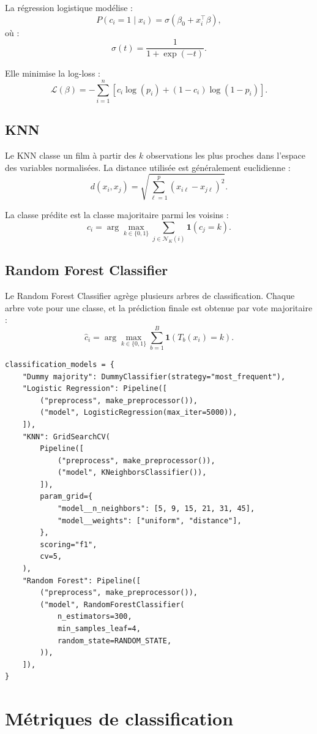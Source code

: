 \documentclass[11pt,a4paper]{article}
\begin{document}
La régression logistique modélise :
\[
P(c_i=1 \mid x_i)
=
\sigma(\beta_0 + x_i^\top\beta),
\]
où :
\[
\sigma(t)=\frac{1}{1+\exp(-t)}.
\]

Elle minimise la log-loss :
\[
\mathcal{L}(\beta)
=
-\sum_{i=1}^{n}
\left[
c_i \log(p_i)
+
(1-c_i)\log(1-p_i)
\right].
\]

\subsection{KNN}

Le KNN classe un film à partir des $k$ observations les plus proches dans l'espace des variables normalisées. La distance utilisée est généralement euclidienne :
\[
d(x_i,x_j)
=
\sqrt{
\sum_{\ell=1}^{p}
(x_{i\ell}-x_{j\ell})^2
}.
\]

La classe prédite est la classe majoritaire parmi les voisins :
\[
\hat{c}_i =
\arg\max_{k \in \{0,1\}}
\sum_{j \in \mathcal{N}_K(i)}
\mathbf{1}(c_j=k).
\]

\subsection{Random Forest Classifier}

Le Random Forest Classifier agrège plusieurs arbres de classification. Chaque arbre vote pour une classe, et la prédiction finale est obtenue par vote majoritaire :
\[
\hat{c}_i =
\arg\max_{k \in \{0,1\}}
\sum_{b=1}^{B}
\mathbf{1}(T_b(x_i)=k).
\]

\begin{lstlisting}[caption={Comparaison des classifieurs.}]
classification_models = {
    "Dummy majority": DummyClassifier(strategy="most_frequent"),
    "Logistic Regression": Pipeline([
        ("preprocess", make_preprocessor()),
        ("model", LogisticRegression(max_iter=5000)),
    ]),
    "KNN": GridSearchCV(
        Pipeline([
            ("preprocess", make_preprocessor()),
            ("model", KNeighborsClassifier()),
        ]),
        param_grid={
            "model__n_neighbors": [5, 9, 15, 21, 31, 45],
            "model__weights": ["uniform", "distance"],
        },
        scoring="f1",
        cv=5,
    ),
    "Random Forest": Pipeline([
        ("preprocess", make_preprocessor()),
        ("model", RandomForestClassifier(
            n_estimators=300,
            min_samples_leaf=4,
            random_state=RANDOM_STATE,
        )),
    ]),
}
\end{lstlisting}

\section{Métriques de classification}
\end{document}
